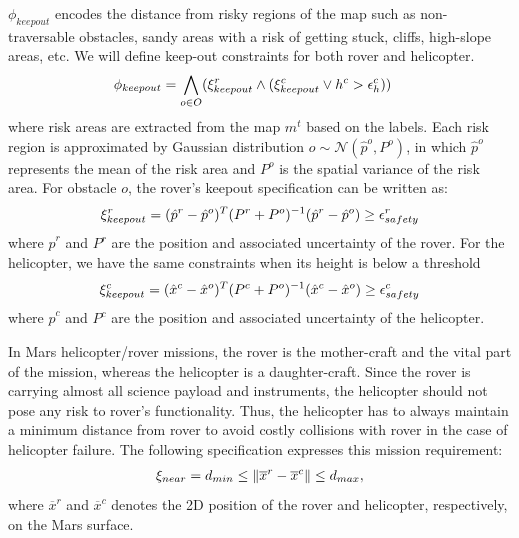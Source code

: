 \documentclass[letterpaper]{article} %
\newcommand{\cristi}[1]{{\color{orange} [Cristi] #1}}
\begin{document}
	\noindent{}
	$\phi_{keepout}$ encodes the distance from risky regions of the map such as non-traversable obstacles, sandy areas with a risk of getting stuck, cliffs, high-slope areas, etc. We will define keep-out constraints for both rover and helicopter.
	\begin{align}
	   \phi_{keepout} &= \bigwedge_{o\in O} (\xi_{keepout}^r \land (\xi_{keepout}^c \lor h^c > \epsilon_{h}^c))
	\end{align}
	where risk areas are extracted from the map $m^t$ based on the labels. Each risk region is approximated by Gaussian distribution $o \sim\mathcal{N}(\hat{p}^o, P^o)$, in which $\hat{p}^o$ represents the mean of the risk area and $P^o$ is the spatial variance of the risk area. For obstacle $o$, the rover's keepout specification can be written as:
	{\small
	\begin{align}
    	\xi_{keepout}^r = (\hat{p}^r-\hat{p}^o)^T(P^r+P^o)^{-1}(\hat{p}^r-\hat{p}^o) \geq \epsilon_{safety}^r
	\end{align}
	}%
	where $\hat{p}^r$ and $P^r$ are the position and associated uncertainty of the rover. For the helicopter, we have the same constraints when its height is below a threshold
	{\small
	\begin{align}
    	\xi_{keepout}^c = (\hat{x}^c-\hat{x}^o)^T(P^c+P^o)^{-1}(\hat{x}^c-\hat{x}^o) \geq \epsilon_{safety}^c
	\end{align}
	}%
	where $\hat{p}^c$ and $P^c$ are the position and associated uncertainty of the helicopter.
    
\noindent{} In Mars helicopter/rover missions, the rover is the mother-craft and the vital part of the mission, whereas the helicopter is a daughter-craft. Since the rover is carrying almost all science payload and instruments, the helicopter should not pose any risk to rover's functionality. Thus, the helicopter has to always maintain a minimum distance from rover to avoid costly collisions with rover in the case of helicopter failure. The following specification expresses this mission requirement:
 	\begin{align}
 	    \xi_{near} = d_{min} \leq \left\| {\overline{x}^r - \overline{x}^c} \right\| \leq d_{max},
 	\end{align}
    where $\overline{x}^r$ and $\overline{x}^c$ denotes the 2D position of the rover and helicopter, respectively, on the Mars surface.
\end{document}
